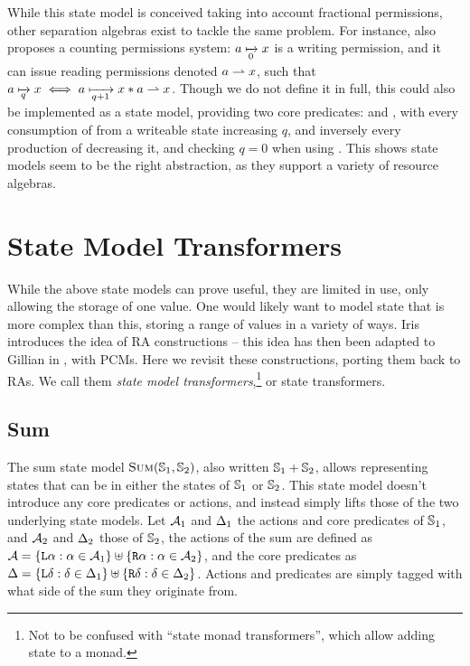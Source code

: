 While this state model is conceived taking into account fractional permissions, other separation algebras exist to tackle the same problem. For instance, \cite{fracpermissions} also proposes a counting permissions system: $a\mapstoq{0}x$ is a writing permission, and it can issue reading permissions denoted $a\rightharpoonup x$, such that $a\mapstoq{q}x \iff a\mapstoq{q+1}x * a\part x$. Though we do not define it in full, this could also be implemented as a state model, providing two core predicates:  and , with every consumption of  from a writeable state increasing $q$, and inversely every production of  decreasing it, and checking $q=0$ when using \store. This shows state models seem to be the right abstraction, as they support a variety of resource algebras.

\section{State Model Transformers} \label{sec:theory-state-model-transf}

While the above state models can prove useful, they are limited in use, only allowing the storage of one value. One would likely want to model state that is more complex than this, storing a range of values in a variety of ways. Iris introduces the idea of RA constructions \cite{iris} -- this idea has then been adapted to Gillian in \cite{sacha-phd}, with PCMs. Here we revisit these constructions, porting them back to RAs. We call them \emph{state model transformers},\footnote{Not to be confused with ``state monad transformers'', which allow adding state to a monad.} or state transformers.

\subsection{Sum}

The sum state model $\textsc{Sum}(\mathbb S_1,\mathbb S_2)$, also written $\mathbb S_1 + \mathbb S_2$, allows representing states that can be in either the states of $\mathbb S_1$ or $\mathbb S_2$. This state model doesn't introduce any core predicates or actions, and instead simply lifts those of the two underlying state models. Let ${\cal{A}}_1$ and $\Delta_1$ the actions and core predicates of $\mathbb S_1$, and ${\cal{A}}_2$ and $\Delta_2$ those of $\mathbb S_2$, the actions of the sum are defined as ${{\cal{A}} = \{\texttt{L}\alpha : \alpha \in {\ensuremath{\cal{A}}}_1 \} \uplus \{\texttt{R}\alpha : \alpha \in {\ensuremath{\cal{A}}}_2 \}}$, and the core predicates as ${\Delta = \{\texttt{L}\delta : \delta \in \Delta_1 \} \uplus \{\texttt{R}\delta : \delta \in \Delta_2 \}}$. Actions and predicates are simply tagged with what side of the sum they originate from.

